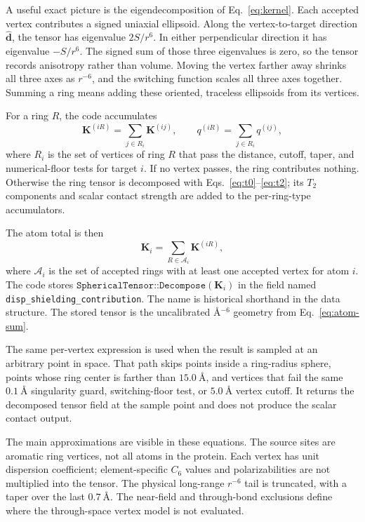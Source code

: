 \documentclass[11pt]{article}
\begin{document}
A useful exact picture is the eigendecomposition of
Eq.~\eqref{eq:kernel}. Each accepted vertex contributes a signed uniaxial
ellipsoid. Along the vertex-to-target direction \(\hat{\bm d}\), the tensor
has eigenvalue \(2S/r^6\). In either perpendicular direction it has eigenvalue
\(-S/r^6\). The signed sum of those three eigenvalues is zero, so the tensor
records anisotropy rather than volume. Moving the vertex farther away shrinks
all three axes as \(r^{-6}\), and the switching function scales all three axes
together. Summing a ring means adding these oriented, traceless ellipsoids
from its vertices.

For a ring \(R\), the code accumulates
\begin{equation}
  \bm K^{(iR)}=\sum_{j\in R_i} \bm K^{(ij)},\qquad
  q^{(iR)}=\sum_{j\in R_i} q^{(ij)},
  \label{eq:ring-sum}
\end{equation}
where \(R_i\) is the set of vertices of ring \(R\) that pass the distance,
cutoff, taper, and numerical-floor tests for target \(i\). If no vertex passes,
the ring contributes nothing. Otherwise the ring tensor is decomposed with
Eqs.~\eqref{eq:t0}--\eqref{eq:t2}; its \(T_2\) components and scalar contact
strength are added to the per-ring-type accumulators.

The atom total is then
\begin{equation}
  \bm K_i=\sum_{R\in\mathcal A_i}\bm K^{(iR)},
  \label{eq:atom-sum}
\end{equation}
where \(\mathcal A_i\) is the set of accepted rings with at least one accepted
vertex for atom \(i\). The code stores
\(\texttt{SphericalTensor::Decompose}(\bm K_i)\) in the field named
\texttt{disp\_shielding\_contribution}. The name is historical shorthand in the
data structure. The stored tensor is the uncalibrated
\(\si{\angstrom^{-6}}\) geometry from Eq.~\eqref{eq:atom-sum}.

The same per-vertex expression is used when the result is sampled at an
arbitrary point in space. That path skips points inside a ring-radius sphere,
points whose ring center is farther than \(\SI{15.0}{\angstrom}\), and
vertices that fail the same \(\SI{0.1}{\angstrom}\) singularity guard,
switching-floor test, or \(\SI{5.0}{\angstrom}\) vertex cutoff. It returns
the decomposed tensor field at the sample point and does not produce the
scalar contact output.

The main approximations are visible in these equations. The source sites are
aromatic ring vertices, not all atoms in the protein. Each vertex has unit
dispersion coefficient; element-specific \(C_6\) values and polarizabilities
are not multiplied into the tensor. The physical long-range \(r^{-6}\) tail is
truncated, with a taper over the last \(\SI{0.7}{\angstrom}\). The near-field
and through-bond exclusions define where the through-space vertex model is not
evaluated.
\end{document}
